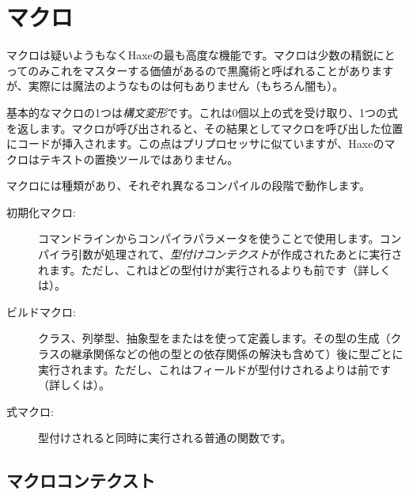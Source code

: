 \chapter{マクロ}
\label{macro}

マクロは疑いようもなくHaxeの最も高度な機能です。マクロは少数の精鋭にとってのみこれをマスターする価値があるので黒魔術と呼ばれることがありますが、実際には魔法のようなものは何もありません（もちろん闇も）。




基本的なマクロの1つは\emph{構文変形}です。これは0個以上の式を受け取り、1つの式を返します。マクロが呼び出されると、その結果としてマクロを呼び出した位置にコードが挿入されます。この点はプリプロセッサに似ていますが、Haxeのマクロはテキストの置換ツールではありません。

マクロには種類があり、それぞれ異なるコンパイルの段階で動作します。

\begin{description}
	\item[初期化マクロ:] コマンドラインからコンパイラパラメータを使うことで使用します。コンパイラ引数が処理されて、\emph{型付けコンテクスト}が作成されたあとに実行されます。ただし、これはどの型付けが実行されるよりも前です（詳しくは）。
	\item[ビルドマクロ:] クラス、列挙型、抽象型をまたはを使って定義します。その型の生成（クラスの継承関係などの他の型との依存関係の解決も含めて）後に型ごとに実行されます。ただし、これはフィールドが型付けされるよりは前です（詳しくは）。
	\item[式マクロ:] 型付けされると同時に実行される普通の関数です。
\end{description}

\section{マクロコンテクスト}
\label{macro-context}


